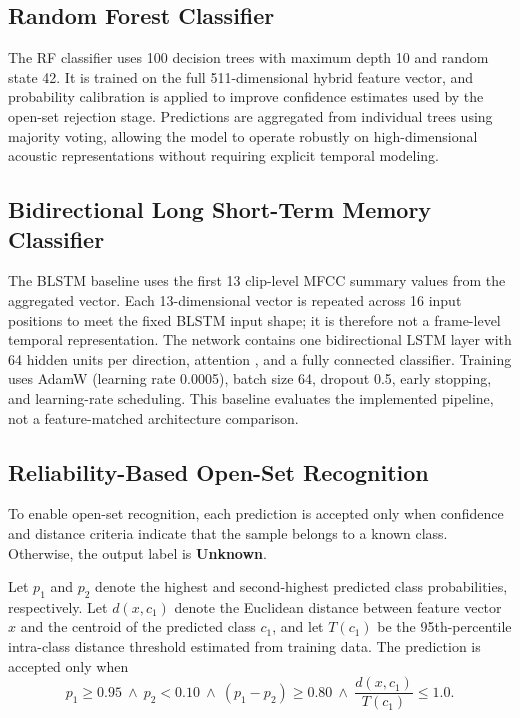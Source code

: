 \documentclass[a4paper,conference]{IEEEtran}
\begin{document}
\subsection{Random Forest Classifier}

The RF classifier uses 100 decision trees with maximum depth 10 and random state 42. It is trained on the full 511-dimensional hybrid feature vector, and probability calibration is applied to improve confidence estimates used by the open-set rejection stage. Predictions are aggregated from individual trees using majority voting, allowing the model to operate robustly on high-dimensional acoustic representations without requiring explicit temporal modeling.

\subsection{Bidirectional Long Short-Term Memory Classifier}

The BLSTM baseline uses the first 13 clip-level MFCC summary values from the aggregated vector. Each 13-dimensional vector is repeated across 16 input positions to meet the fixed BLSTM input shape; it is therefore not a frame-level temporal representation. The network contains one bidirectional LSTM layer with 64 hidden units per direction, attention \cite{bahdanau}, and a fully connected classifier. Training uses AdamW (learning rate 0.0005), batch size 64, dropout 0.5, early stopping, and learning-rate scheduling. This baseline evaluates the implemented pipeline, not a feature-matched architecture comparison.

\subsection{Reliability-Based Open-Set Recognition}

To enable open-set recognition, each prediction is accepted only when confidence and distance criteria indicate that the sample belongs to a known class. Otherwise, the output label is \textbf{Unknown}.

Let $p_1$ and $p_2$ denote the highest and second-highest predicted class probabilities, respectively. Let $d(x,c_1)$ denote the Euclidean distance between feature vector $x$ and the centroid of the predicted class $c_1$, and let $T(c_1)$ be the 95th-percentile intra-class distance threshold estimated from training data. The prediction is accepted only when
\begin{equation}
p_1 \geq 0.95 \ \land\ p_2 < 0.10 \ \land\ (p_1-p_2) \geq 0.80 \ \land\ \frac{d(x,c_1)}{T(c_1)} \leq 1.0.
\label{eq:reliability}
\end{equation}
\end{document}

